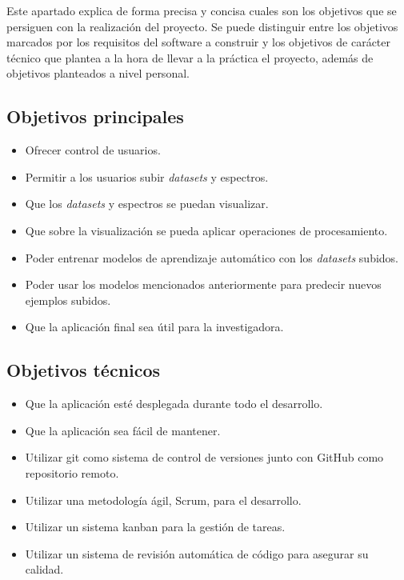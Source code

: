 
Este apartado explica de forma precisa y concisa cuales son los objetivos que se
persiguen con la realización del proyecto. Se puede distinguir entre los
objetivos marcados por los requisitos del software a construir y los objetivos
de carácter técnico que plantea a la hora de llevar a la práctica el proyecto,
además de objetivos planteados a nivel personal.

\subsection{Objetivos principales}
\begin{itemize}
	\tightlist
	\item Ofrecer control de usuarios.
	\item Permitir a los usuarios subir \textit{datasets} y espectros.
	\item Que los \textit{datasets} y espectros se puedan visualizar.
	\item Que sobre la visualización se pueda aplicar operaciones de procesamiento.
	\item Poder entrenar modelos de aprendizaje automático con los
	\textit{datasets} subidos.
	\item Poder usar los modelos mencionados anteriormente para predecir nuevos
	ejemplos subidos.
	\item Que la aplicación final sea útil para la investigadora.
\end{itemize}

\subsection{Objetivos técnicos}
\begin{itemize}
	\tightlist
	\item Que la aplicación esté desplegada durante todo el desarrollo.
	\item Que la aplicación sea fácil de mantener.
	\item Utilizar git como sistema de control de versiones junto con GitHub como
	repositorio remoto.
	\item Utilizar una metodología ágil, Scrum, para el desarrollo.
	\item Utilizar un sistema kanban para la gestión de tareas.
	\item Utilizar un sistema de revisión automática de código para asegurar su
	calidad.
\end{itemize}

